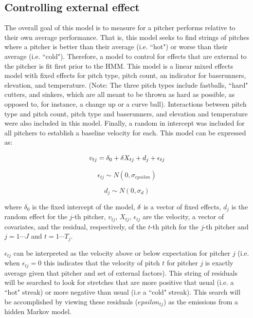 \documentclass[letterpaper,12pt]{article}\usepackage[]{graphicx}\usepackage[]{color}
\begin{document}
\subsection{Controlling external effect}
The overall goal of this model is to measure for a pitcher performs relative to their own average performance.  That is, this model seeks to find strings of pitches where a pitcher is better than their average (i.e. ``hot") or worse than their average (i.e. ``cold").  Therefore, a model to control for effects that are external to the pitcher is fit first prior to the HMM.  This model is a linear mixed effects model with fixed effects for pitch type, pitch count, an indicator for baserunners, elevation, and temperature.  (Note: The three pitch types include fastballs, ``hard" cutters, and sinkers, which are all meant to be thrown as hard as possible, as opposed to, for instance, a change up or a curve ball).  Interactions between pitch type and pitch count, pitch type and baserunners, and elevation and temperature were also included in this model.  Finally, a random in intercept was included for all pitchers to establish a baseline velocity for each.   This model can be expressed as: 

$$
v_{tj} = \delta_0 + {\bf \delta} X_{tj} + d_{j} + \epsilon_{tj}
$$

$$
\epsilon_{tj} \sim N(0,\sigma_{epsilon})
$$

$$
d_{j} \sim N(0,\sigma_{d})
$$

where $\delta_0$ is the fixed intercept of the model, ${\bf \delta}$ is a vector of fixed effects,  $d_{j}$ is the random effect for the $j$-th pitcher, $v_{tj}$, $X_{tj}$, $\epsilon_{tj}$ are the velocity, a vector of covariates, and the residual, respectively, of the $t$-th pitch for the $j$-th pitcher and $j=1\cdots J$ and $t=1\cdots T_{j}$.  

$\epsilon_{tj}$ can be interpreted as the velocity above or below expectation for pitcher $j$ (i.e. when $\epsilon_{tj}=0$ this indicates that the velocity of pitch $t$ for pitcher $j$ is exactly average given that pitcher and set of external factors).  This string of residuals will be searched to look for stretches that are more positive that usual (i.e. a ``hot" streak) or more negative than usual (i.e a ``cold" streak).  
This search will be accomplished by viewing these residuals ($epsilon_{tj}$) as the emissions from a  hidden Markov model. 
\end{document}
